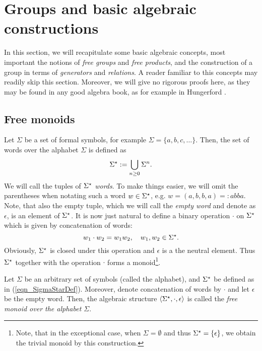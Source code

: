 \section{Groups and basic algebraic constructions}

In this section, we will recapitulate some basic algebraic concepts, most important the notions of \emph{free groups} and \emph{free products}, and the construction of a group in terms of \emph{generators} and \emph{relations}. A reader familiar to this concepts may readily skip this section. Moreover, we will give no rigorous proofs here, as they may be found in any good algebra book, as for example in Hungerford \cite{hungerford1974algebra}.

\subsection{Free monoids}
Let $\Sigma$ be a set of formal symbols, for example $\Sigma = \{a, b, c, \dots\}$. Then, the set of words over the alphabet $\Sigma$ is defined as
\begin{equation}
\label{eqn_SigmaStarDef}
{\Sigma}^{\star} := \bigcup_{n\ge0} \Sigma^n.
\end{equation}
We will call the tuples of ${\Sigma}^{\star}$ \emph{words}. To make things easier, we will omit the parentheses when notating such a word $w \in {\Sigma}^{\star}$, e.g. $w = (a,b,b,a) =: abba$. Note, that also the empty tuple, which we will call the \emph{empty word} and denote as $\epsilon$, is an element of ${\Sigma}^{\star}$. It is now just natural to define a binary operation $\cdot$ on ${\Sigma}^{\star}$ which is given by concatenation of words:
\begin{equation*}
w_1 \cdot w_2 = w_1 w_2, \quad w_1, w_2 \in {\Sigma}^{\star}.
\end{equation*}
Obviously, ${\Sigma}^{\star}$ is closed under this operation and $\epsilon$ is a the neutral element. Thus ${\Sigma}^{\star}$ together with the operation $\cdot$ forms a monoid\footnote{Note, that in the exceptional case, when $\Sigma = \emptyset$ and thus ${\Sigma}^{\star} = \{\epsilon\}$, we obtain the trivial monoid by this construction.}. 

\begin{definition}
\label{dfn_FreeMonoid}
Let $\Sigma$ be an arbitrary set of symbols (called the alphabet), and ${\Sigma}^{\star}$ be defined as in (\ref{eqn_SigmaStarDef}). Moreover, denote concatenation of words by $\cdot$ and let $\epsilon$ be the empty word. Then, the algebraic structure $\langle {\Sigma}^{\star}, \cdot, \epsilon \rangle$ is called the \emph{free monoid over the alphabet $\Sigma$}.
\end{definition} 

